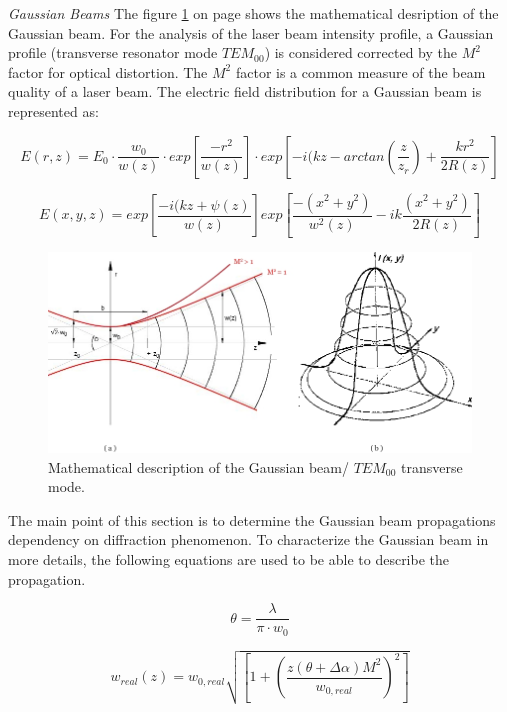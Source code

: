 \textit{Gaussian Beams}
The figure \ref{gaussian_beam} on page \pageref{gaussian_beam} shows the mathematical desription of the Gaussian beam. For the analysis of the \acs{laser} beam intensity profile, a Gaussian profile (transverse resonator mode $TEM_{00}$) is considered corrected by the $M^{2}$ factor for optical distortion. The $M^{2}$ factor is a common measure of the beam quality of a laser beam.  The electric field distribution for a Gaussian beam is represented as:

\begin{equation}
	E(r,z) = E_{0}\cdot \frac{w_{0}}{w(z)} \cdot exp\left[\frac{-r^{2}}{w(z)}\right]\cdot exp\left[-i(kz-arctan\left(\frac{z}{z_{r}}\right)+\frac{kr^{2}}{2R(z)}\right]
\end{equation}

\begin{equation}
	E(x,y,z) = exp\left[\frac{-i(kz + \psi(z)}{w(z)}\right]exp\left[\frac{-(x^{2}+y^{2})}{w^{2}(z)} - ik \frac{(x^{2}+y^{2})}{2R(z)}\right]
\end{equation}

\begin{figure} [ht]
\centering
\includegraphics[scale=0.5]{chapters/img/TEM00.jpg}	
\caption{Mathematical description of the Gaussian beam/ $TEM_{00}$ transverse mode.}
\label{gaussian_beam}
\end{figure}

The main point of this section is to determine the Gaussian beam propagations dependency on diffraction phenomenon. To characterize the Gaussian beam in more details, the following equations are used to be able to describe the propagation.

\begin{equation}
\theta = \frac{\lambda}{\pi\cdot w_{0}}
\end{equation}

\begin{equation}
w_{real}(z)=w_{0,real}\sqrt{\left[1 + \left(\frac{z(\theta+\Delta \alpha) M^{2}}{w_{0,real}}\right)^{2}\right]}
\end{equation}

